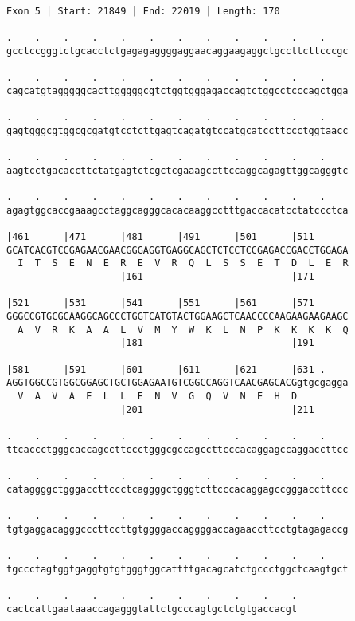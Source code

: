 \documentclass{article}
\begin{document}
\newpage
\begin{Verbatim}
Exon 5 | Start: 21849 | End: 22019 | Length: 170
 
.    .    .    .    .    .    .    .    .    .    .    .    
gcctccgggtctgcacctctgagagaggggaggaacaggaagaggctgccttcttcccgc
  
.    .    .    .    .    .    .    .    .    .    .    .    
cagcatgtagggggcacttgggggcgtctggtgggagaccagtctggcctcccagctgga
  
.    .    .    .    .    .    .    .    .    .    .    .    
gagtgggcgtggcgcgatgtcctcttgagtcagatgtccatgcatccttccctggtaacc
  
.    .    .    .    .    .    .    .    .    .    .    .    
aagtcctgacaccttctatgagtctcgctcgaaagccttccaggcagagttggcagggtc
  
.    .    .    .    .    .    .    .    .    .    .    .    
agagtggcaccgaaagcctaggcagggcacacaaggcctttgaccacatcctatccctca
  
|461      |471      |481      |491      |501      |511      
GCATCACGTCCGAGAACGAACGGGAGGTGAGGCAGCTCTCCTCCGAGACCGACCTGGAGA
  I  T  S  E  N  E  R  E  V  R  Q  L  S  S  E  T  D  L  E  R
                    |161                          |171      
  
|521      |531      |541      |551      |561      |571      
GGGCCGTGCGCAAGGCAGCCCTGGTCATGTACTGGAAGCTCAACCCCAAGAAGAAGAAGC
  A  V  R  K  A  A  L  V  M  Y  W  K  L  N  P  K  K  K  K  Q
                    |181                          |191      
  
|581      |591      |601      |611      |621      |631 .    
AGGTGGCCGTGGCGGAGCTGCTGGAGAATGTCGGCCAGGTCAACGAGCACGgtgcgagga
  V  A  V  A  E  L  L  E  N  V  G  Q  V  N  E  H  D         
                    |201                          |211      
  
.    .    .    .    .    .    .    .    .    .    .    .    
ttcaccctgggcaccagccttccctgggcgccagccttcccacaggagccaggaccttcc
  
.    .    .    .    .    .    .    .    .    .    .    .    
cataggggctgggaccttccctcaggggctgggtcttcccacaggagccgggaccttccc
  
.    .    .    .    .    .    .    .    .    .    .    .    
tgtgaggacagggcccttccttgtggggaccaggggaccagaaccttcctgtagagaccg
  
.    .    .    .    .    .    .    .    .    .    .    .    
tgccctagtggtgaggtgtgtgggtggcattttgacagcatctgccctggctcaagtgct
  
.    .    .    .    .    .    .    .    .    .    .
cactcattgaataaaccagagggtattctgcccagtgctctgtgaccacgt
\end{Verbatim}
\end{document}
